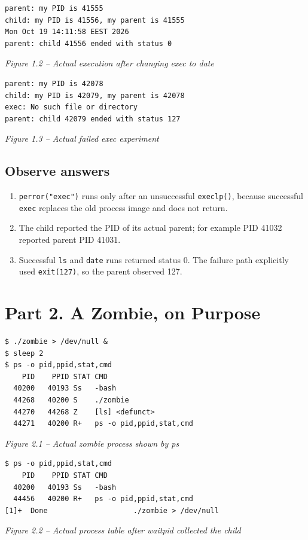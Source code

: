 \documentclass[12pt,a4paper]{article}
\newcommand{\figcap}[1]{\begin{center}\small\textit{#1}\end{center}\vspace{0.4em}}
\begin{document}
\begin{lstlisting}
parent: my PID is 41555
child: my PID is 41556, my parent is 41555
Mon Oct 19 14:11:58 EEST 2026
parent: child 41556 ended with status 0
\end{lstlisting}
\figcap{Figure 1.2 -- Actual execution after changing exec to date}

\begin{lstlisting}
parent: my PID is 42078
child: my PID is 42079, my parent is 42078
exec: No such file or directory
parent: child 42079 ended with status 127
\end{lstlisting}
\figcap{Figure 1.3 -- Actual failed exec experiment}

\subsection{Observe answers}
\begin{enumerate}[label=\arabic*.]
\item \texttt{perror("exec")} runs only after an unsuccessful \texttt{execlp()}, because successful \texttt{exec} replaces the old process image and does not return.
\item The child reported the PID of its actual parent; for example PID 41032 reported parent PID 41031.
\item Successful \texttt{ls} and \texttt{date} runs returned status 0. The failure path explicitly used \texttt{exit(127)}, so the parent observed 127.
\end{enumerate}

\section{Part 2. A Zombie, on Purpose}
\begin{lstlisting}
$ ./zombie > /dev/null &
$ sleep 2
$ ps -o pid,ppid,stat,cmd
    PID    PPID STAT CMD
  40200   40193 Ss   -bash
  44268   40200 S    ./zombie
  44270   44268 Z    [ls] <defunct>
  44271   40200 R+   ps -o pid,ppid,stat,cmd
\end{lstlisting}
\figcap{Figure 2.1 -- Actual zombie process shown by ps}

\begin{lstlisting}
$ ps -o pid,ppid,stat,cmd
    PID    PPID STAT CMD
  40200   40193 Ss   -bash
  44456   40200 R+   ps -o pid,ppid,stat,cmd
[1]+  Done                    ./zombie > /dev/null
\end{lstlisting}
\figcap{Figure 2.2 -- Actual process table after waitpid collected the child}
\end{document}
